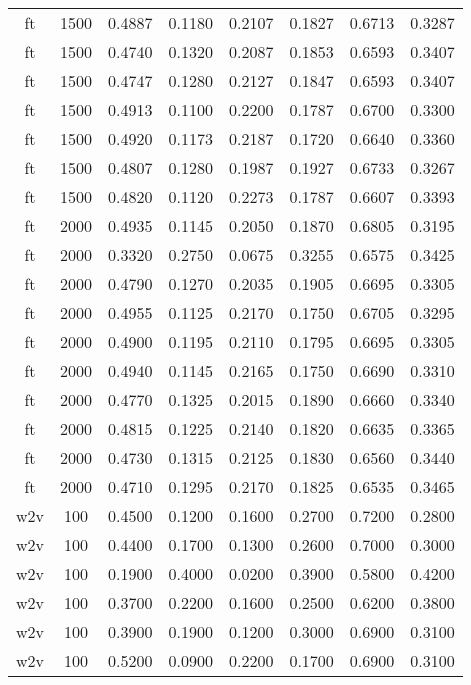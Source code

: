 \begin{scriptsize}
\begin{longtable}{cccccccc}
		ft       & 1500 & 0.4887 & 0.1180 & 0.2107 & 0.1827 & 0.6713 & 0.3287 \\
		ft       & 1500 & 0.4740 & 0.1320 & 0.2087 & 0.1853 & 0.6593 & 0.3407 \\
		ft       & 1500 & 0.4747 & 0.1280 & 0.2127 & 0.1847 & 0.6593 & 0.3407 \\
		ft       & 1500 & 0.4913 & 0.1100 & 0.2200 & 0.1787 & 0.6700 & 0.3300 \\
		ft       & 1500 & 0.4920 & 0.1173 & 0.2187 & 0.1720 & 0.6640 & 0.3360 \\
		ft       & 1500 & 0.4807 & 0.1280 & 0.1987 & 0.1927 & 0.6733 & 0.3267 \\
		ft       & 1500 & 0.4820 & 0.1120 & 0.2273 & 0.1787 & 0.6607 & 0.3393 \\
		ft       & 2000 & 0.4935 & 0.1145 & 0.2050 & 0.1870 & 0.6805 & 0.3195 \\
		ft       & 2000 & 0.3320 & 0.2750 & 0.0675 & 0.3255 & 0.6575 & 0.3425 \\
		ft       & 2000 & 0.4790 & 0.1270 & 0.2035 & 0.1905 & 0.6695 & 0.3305 \\
		ft       & 2000 & 0.4955 & 0.1125 & 0.2170 & 0.1750 & 0.6705 & 0.3295 \\
		ft       & 2000 & 0.4900 & 0.1195 & 0.2110 & 0.1795 & 0.6695 & 0.3305 \\
		ft       & 2000 & 0.4940 & 0.1145 & 0.2165 & 0.1750 & 0.6690 & 0.3310 \\
		ft       & 2000 & 0.4770 & 0.1325 & 0.2015 & 0.1890 & 0.6660 & 0.3340 \\
		ft       & 2000 & 0.4815 & 0.1225 & 0.2140 & 0.1820 & 0.6635 & 0.3365 \\
		ft       & 2000 & 0.4730 & 0.1315 & 0.2125 & 0.1830 & 0.6560 & 0.3440 \\
		ft       & 2000 & 0.4710 & 0.1295 & 0.2170 & 0.1825 & 0.6535 & 0.3465 \\
		w2v      & 100  & 0.4500 & 0.1200 & 0.1600 & 0.2700 & 0.7200 & 0.2800 \\
		w2v      & 100  & 0.4400 & 0.1700 & 0.1300 & 0.2600 & 0.7000 & 0.3000 \\
		w2v      & 100  & 0.1900 & 0.4000 & 0.0200 & 0.3900 & 0.5800 & 0.4200 \\
		w2v      & 100  & 0.3700 & 0.2200 & 0.1600 & 0.2500 & 0.6200 & 0.3800 \\
		w2v      & 100  & 0.3900 & 0.1900 & 0.1200 & 0.3000 & 0.6900 & 0.3100 \\
		w2v      & 100  & 0.5200 & 0.0900 & 0.2200 & 0.1700 & 0.6900 & 0.3100 \\

\end{longtable}
\end{scriptsize}
